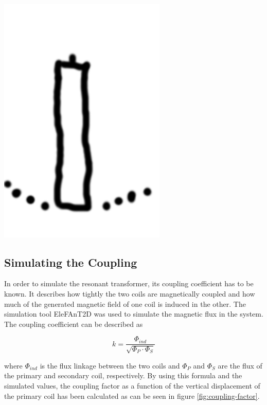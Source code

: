 \begin{marginfigure}
\centering
\includegraphics[width=0.6\textwidth]{simon/resources/teslaCoilSketch.png}
\end{marginfigure}

\subsection{Simulating the Coupling}

In order to simulate the resonant transformer, its coupling coefficient has to be known. It describes how tightly the two coils are magnetically coupled and how much of the generated magnetic field of one coil is induced in the other. The simulation tool EleFAnT2D was used to simulate the magnetic flux in the system. The coupling coefficient can be described as

\begin{equation}
    k = \frac{\Phi_{ind}}{\sqrt{\Phi_P \cdot \Phi_S}}
\end{equation}

where \(\Phi_{ind}\) is the flux linkage between the two coils and \(\Phi_P\) and \(\Phi_S\) are the flux of the primary and secondary coil, respectively. By using this formula and the simulated values, the coupling factor as a function of the vertical displacement of the primary coil has been calculated as can be seen in figure \ref{fig:coupling-factor}.

